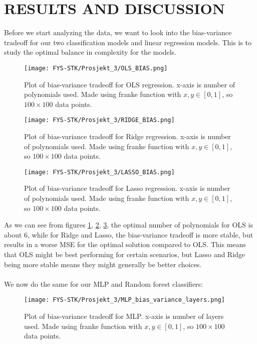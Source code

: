 \documentclass[english,notitlepage,reprint,nofootinbib]{revtex4-1}  %
\begin{document}
\section{RESULTS AND DISCUSSION}\label{sec: DISCUSSION}
Before we start analyzing the data, we want to look into the bias-variance tradeoff for our two classification models and linear regression models. This is to study the optimal balance in complexity for the models.  

\begin{figure}[H]
    \centering
    \texttt{[image: FYS-STK/Prosjekt\_3/OLS\_BIAS.png]}
    \caption{Plot of bias-variance tradeoff for OLS regression. x-axis is number of polynomials used. Made using franke function with $x,y \in [0,1]$, so $100 \times 100$ data points.}
    \label{fig: OLS_BIAS}
\end{figure}

\begin{figure}[H]
    \centering
    \texttt{[image: FYS-STK/Prosjekt\_3/RIDGE\_BIAS.png]}
    \caption{Plot of bias-variance tradeoff for Ridge regression. x-axis is number of polynomials used. Made using franke function with $x,y \in [0,1]$, so $100 \times 100$ data points.}
    \label{fig: RIDGE_BIAS}
\end{figure}

\begin{figure}[H]
    \centering
    \texttt{[image: FYS-STK/Prosjekt\_3/LASSO\_BIAS.png]}
    \caption{Plot of bias-variance tradeoff for Lasso regression. x-axis is number of polynomials used. Made using franke function with $x,y \in [0,1]$, so $100 \times 100$ data points.}
    \label{fig: LASSO_BIAS}
\end{figure}

As we can see from figures \ref{fig: OLS_BIAS}, \ref{fig: RIDGE_BIAS}, \ref{fig: LASSO_BIAS}, the optimal number of polynomials for OLS is about 6, while for Ridge and Lasso, the bias-variance tradeoff is more stable, but results in a worse MSE for the optimal solution compared to OLS.
This means that OLS might be best performing for certain scenarios, but Lasso and Ridge being more stable means they might generally be better choices.
\\
\\
We now do the same for our MLP and Random forest classifiers:

\begin{figure}[H]
    \centering
    \texttt{[image: FYS-STK/Prosjekt\_3/MLP\_bias\_variance\_layers.png]}
    \caption{Plot of bias-variance tradeoff for MLP. x-axis is number of layers used. Made using franke function with $x,y \in [0,1]$, so $100 \times 100$ data points.}
    \label{fig: MLP_BIAS}
\end{figure}
\end{document}

